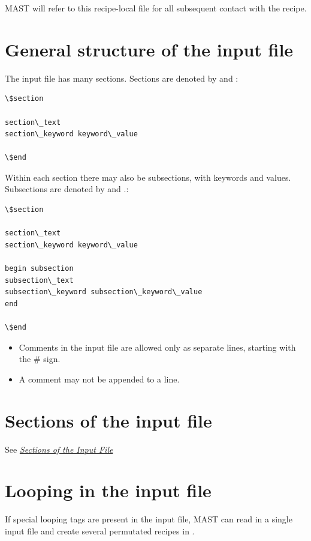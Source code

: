 \documentclass[letterpaper,10pt,english]{sphinxmanual}
\begin{document}
MAST will refer to this recipe-local  file for all subsequent contact with the recipe.


\section{General structure of the input file}
\label{3_0_inputfile:general-structure-of-the-input-file}
The input file has many sections. Sections are denoted by  and :

\begin{Verbatim}[commandchars=\\\{\}]
\$section

section\_text
section\_keyword keyword\_value

\$end
\end{Verbatim}

Within each section there may also be subsections, with keywords and values.
Subsections are denoted by  and .:

\begin{Verbatim}[commandchars=\\\{\}]
\$section

section\_text
section\_keyword keyword\_value

begin subsection
subsection\_text
subsection\_keyword subsection\_keyword\_value
end

\$end
\end{Verbatim}
\begin{itemize}
\item {} 
Comments in the input file are allowed only as separate lines, starting with the \# sign.

\item {} 
A comment may not be appended to a line.

\end{itemize}


\section{Sections of the input file}
\label{3_0_inputfile:sections-of-the-input-file}
See {\hyperref[3_1_inputsections::doc]{\emph{Sections of the Input File}}}


\section{Looping in the input file}
\label{3_0_inputfile:looping-in-the-input-file}
If special looping tags are present in the input file, MAST can read in a single input file and create several permutated recipes in .
\end{document}
